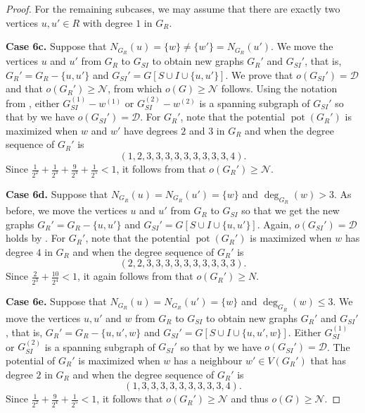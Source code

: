 \documentclass[a4paper,11pt,oneside]{scrartcl}
\theoremstyle{definition}
\theoremstyle{remark}
\DeclareMathOperator{\pot}{pot}
\begin{document}
\begin{proof}
    For the remaining subcases, we may assume that there are exactly two vertices $u,u' \in R$ with degree $1$ in $G_R$.

    \textbf{Case 6c.} Suppose that $N_{G_R}(u) = \{w\} \neq \{w'\} = N_{G_R}(u')$. We move the vertices $u$ and $u'$ from $G_R$ to $G_{SI}$ to obtain new graphs $G_R'$ and $G_{SI}'$, that is, $G_R' = G_R -\{u, u'\}$ and $G_{SI}' = G[S\cup I \cup \{u, u'\}]$. We prove that $o(G_{SI}') = \mathcal D$ and that $o(G_R') \geq \mathcal N$, from which $o(G) \geq \mathcal N$ follows. Using the notation from , either $G_{SI}^{(1)} - w^{(1)}$ or $G_{SI}^{(2)} - w^{(2)}$ is a spanning subgraph of $G_{SI}'$ so that by  we have $o(G_{SI}') = \mathcal D$. For $G_R'$, note that the potential $\pot(G_R')$ is maximized when $w$ and $w'$ have degrees $2$ and $3$ in $G_R$ and when the degree sequence of $G_R'$ is 
    \[
        (1,2,3,3,3,3,3,3,3,3,3,4).
    \]
    Since $\frac{1}{2^2} + \frac{1}{2^3} + \frac{9}{2^4} + \frac{1}{2^5} < 1$, it follows from  that $o(G_R') \geq \mathcal N$.
    
    \textbf{Case 6d. } Suppose that $N_{G_R}(u) = N_{G_R}(u') = \{w\}$ and $\deg_{G_R}(w) > 3$. As before, we move the vertices $u$ and $u'$ from $G_R$ to $G_{SI}$ so that we get the new graphs $G_R' = G_R -\{u, u'\}$ and $G_{SI}' = G[S\cup I \cup \{u, u'\}]$. Again, $o(G_{SI}') = \mathcal D$ holds by . For $G_R'$, note that the potential $\pot(G_R')$ is maximized when $w$ has degree $4$ in $G_R$ and when the degree sequence of $G_R'$ is 
    \[
        (2,2,3,3,3,3,3,3,3,3,3,3).
    \]
    Since $\frac{2}{2^3} + \frac{10}{2^4} < 1$, it again follows from  that $o(G_R') \geq N$.    
    
    \textbf{Case 6e. } Suppose that $N_{G_R}(u) = N_{G_R}(u') = \{w\}$ and $\deg_{G_R}(w) \leq 3$. We move the vertices $u, u'$ and $w$ from $G_R$ to $G_{SI}$ to obtain new graphs $G_R'$ and $G_{SI}'$, that is, $G_R' = G_R -\{u, u', w\}$ and $G_{SI}' = G[S\cup I \cup \{u, u', w\}]$. Either $G_{SI}^{(1)}$ or $G_{SI}^{(2)}$ is a spanning subgraph of $G_{SI}'$ so that by  we have $o(G_{SI}') = \mathcal D$. The potential of $G_R'$ is maximized when $w$ has a neighbour $w' \in V(G_R')$ that has degree $2$ in $G_R$ and when the degree sequence of $G_R'$ is 
    \[
        (1,3,3,3,3,3,3,3,3,3,4).
    \] 
    Since $\frac 1{2^2} + \frac {9}{2^4} + \frac{1}{2^5} < 1$, it follows that $o(G_R') \geq \mathcal N$ and thus $o(G) \geq \mathcal N$. 
\end{proof}
\end{document}
